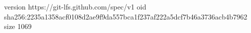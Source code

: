 version https://git-lfs.github.com/spec/v1
oid sha256:2235a1358acf0108d2ae9f9da557bca1f237af222a5dcf7b46a3736acb4b7962
size 1069
